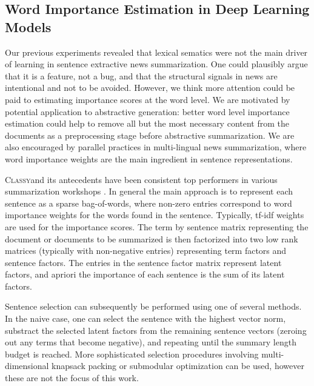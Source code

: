 \subsection{Word Importance Estimation in Deep Learning Models}



Our previous experiments revealed that lexical sematics were not the 
main driver of learning in sentence extractive news summarization. 
One could plausibly argue that it is a feature, not a bug, and that 
the structural
signals in news are intentional and not to be avoided. However, we think more 
attention could be paid to estimating importance scores at the word level.
We are motivated by potential application to abstractive generation: better
word level importance estimation could help to remove all but the most 
necessary content from the documents as a preprocessing stage before
abstractive summarization. We are also encouraged by parallel practices
in multi-lingual news summarization, where word importance weights 
are the main ingredient in sentence representations. 


\newcommand{\mlingsys}{\textsc{Classy}}


\mlingsys and its antecedents have been consistent top performers in various
summarization workshops \cite{tac,multiling}. In general the main approach 
is to represent each sentence as a sparse bag-of-words, where non-zero
entries correspond to word importance weights for the words found in the 
sentence. Typically, tf-idf weights are used for the importance scores.
The term by sentence matrix representing the document or documents to be
summarized is then factorized into two low rank matrices (typically with
non-negative entries) representing term factors and sentence factors.
The entries in the sentence factor matrix represent latent factors, 
and apriori the importance of each sentence is the sum of its latent factors.

Sentence selection can subsequently be performed using one of several methods.
In the naive case, one can select the sentence with the highest vector norm, 
substract the selected latent factors from the remaining sentence vectors
(zeroing out any terms that become negative), and repeating until the
summary length budget is reached. More sophisticated selection procedures
involving multi-dimensional knapsack packing or submodular optimization 
can be used, however these are not the focus of this work.

